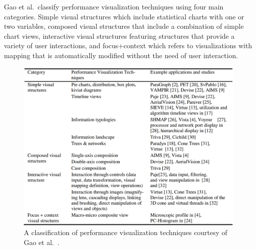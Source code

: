 Gao et al.\ classify performance visualization techniques using four main categories. Simple visual structures which include statistical charts with one or two variables, composed visual structures that include a combination of simple chart views, interactive visual structures featuring structures that provide a variety of user interactions, and focus+context which refers to visualizations with mapping that is automatically modified without the need of user interaction.


\begin{figure}[t]
\begin{center}
\includegraphics[width=1\textwidth]{images/gao2011performance}
\caption{A classification of performance visualization techniques courtesy of Gao et al.\ \cite{gao2011performance}.} \label{fig: gao2011performance}
\end{center}
\end{figure}

%
%

